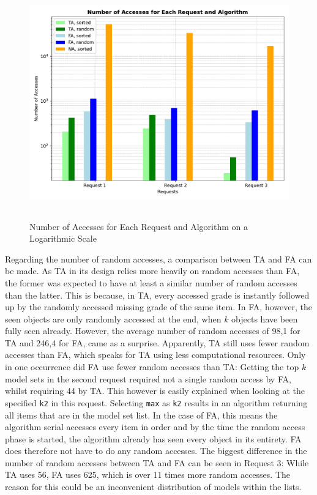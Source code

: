 \begin{figure}[htbp]
    \centering
    \includegraphics[height=10cm]{plots/grouped_accesses.pdf}
    \caption{Number of Accesses for Each Request and Algorithm on a Logarithmic Scale}
    \label{fig:shift24h}
  \end{figure}


Regarding the number of random accesses, a comparison between TA and FA can be made. As TA in its design relies more heavily on random accesses than FA, the former was expected to have at least a similar number of random accesses than the latter. This is because, in TA, every accessed grade is instantly followed up by the randomly accessed missing grade of the same item. In FA, however, the seen objects are only randomly accessed at the end, when $k$ objects have been fully seen already. However, the average number of random accesses of 98,1 for TA and 246,4 for FA, came as a surprise. Apparently, TA still uses fewer random accesses than FA, which speaks for TA using less computational resources. Only in one occurrence did FA use fewer random accesses than TA: Getting the top $k$ model sets in the second request required not a single random access by FA, whilst requiring 44 by TA. This however is easily explained when looking at the specified \texttt{k2} in this request. Selecting \texttt{max} as \texttt{k2} results in an algorithm returning all items that are in the model set list. In the case of FA, this means the algorithm serial accesses every item in order and by the time the random access phase is started, the algorithm already has seen every object in its entirety. FA does therefore not have to do any random accesses. The biggest difference in the number of random accesses between TA and FA can be seen in Request 3: While TA uses 56, FA uses 625, which is over 11 times more random accesses. The reason for this could be an inconvenient distribution of models within the lists.

